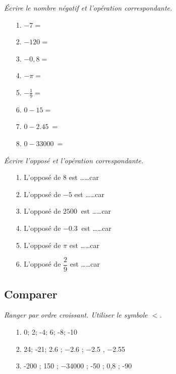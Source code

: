 \begin{multicols}{2}

  \textit{Écrire le nombre négatif et l'opération correspondante.}

  \begin{enumerate}
    \item[1.] $  -7 = $ \dotfill
    \item[2.] $-120 = $ \dotfill
    \item[3.] $-0,8 = $ \dotfill
    \item[4.] $-\pi = $ \dotfill
    \item[5.] $ -\frac{1}{9} = $ \dotfill
    \item[6.] $0 - 15 = $  \dotfill
    \item[7.] $0 - \SI{2,45}{} = $  \dotfill
    \item[8.] $0 - \SI{33000}{} = $  \dotfill   
  \end{enumerate}
  \columnbreak

  \textit{Écrire l'opposé et l'opération correspondante.}

  \begin{enumerate}
    \item[1.] L'opposé de $8$ est \dots \dots car \dotfill
    \item[2.] L'opposé de $-5$ est \dots \dots car \dotfill
    \item[3.] L'opposé de $\SI{2500}{}$ est \dots \dots car \dotfill
    \item[4.] L'opposé de $\SI{-0,3}{}$ est \dots \dots car \dotfill
    \item[5.] L'opposé de $\pi$ est \dots \dots car \dotfill
    \item[6.] L'opposé de $\dfrac{2}{9}$ est \dots \dots car \dotfill
  \end{enumerate}

\end{multicols}

\subsection*{Comparer}

\textit{Ranger par ordre croissant. Utiliser le symbole $<$.}

\begin{enumerate}
  \item[1.] 0; 2; -4; 6; -8; -10
  \Pointilles[1]   
  \item[2.] 24; -21; \SI{2,6}{} ; \SI{-2,6}{} ; \SI{-2,5}{} , \SI{-2,55}{} 
  \Pointilles[1]   
  \item[3.] -200 ; 150 ; \SI{-34000}{} ; -50 ; 0,8 ; -90
  \Pointilles[1]   
\end{enumerate}


